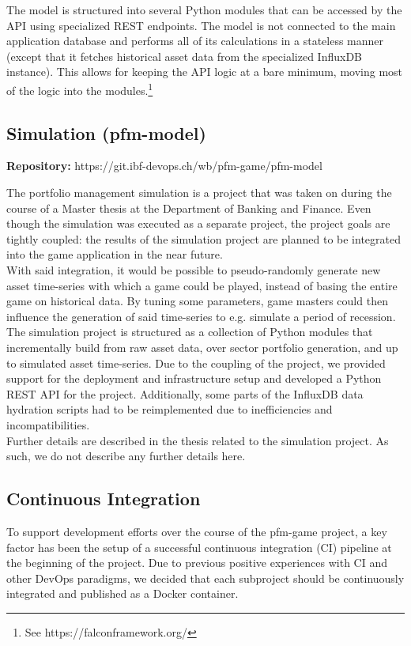 The model is structured into several Python modules that can be accessed by the API using specialized REST endpoints. The model is not connected to the main application database and performs all of its calculations in a stateless manner (except that it fetches historical asset data from the specialized InfluxDB instance). This allows for keeping the API logic at a bare minimum, moving most of the logic into the modules.\footnote{See https://falconframework.org/}


\subsection{Simulation (pfm-model)}

\begin{flushright}
  \textbf{Repository:} https://git.ibf-devops.ch/wb/pfm-game/pfm-model
\end{flushright}

The portfolio management simulation is a project that was taken on during the course of a Master thesis at the Department of Banking and Finance. Even though the simulation was executed as a separate project, the project goals are tightly coupled: the results of the simulation project are planned to be integrated into the game application in the near future.\\

With said integration, it would be possible to pseudo-randomly generate new asset time-series with which a game could be played, instead of basing the entire game on historical data. By tuning some parameters, game masters could then influence the generation of said time-series to e.g. simulate a period of recession.\\

The simulation project is structured as a collection of Python modules that incrementally build from raw asset data, over sector portfolio generation, and up to simulated asset time-series. Due to the coupling of the project, we provided support for the deployment and infrastructure setup and developed a Python REST API for the project. Additionally, some parts of the InfluxDB data hydration scripts had to be reimplemented due to inefficiencies and incompatibilities.\\

Further details are described in the thesis related to the simulation project. As such, we do not describe any further details here.


\subsection{Continuous Integration}

To support development efforts over the course of the pfm-game project, a key factor has been the setup of a successful continuous integration (CI) pipeline at the beginning of the project. Due to previous positive experiences with CI and other DevOps paradigms, we decided that each subproject should be continuously integrated and published as a Docker container.
